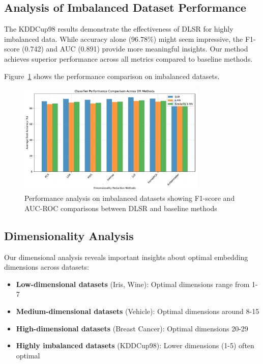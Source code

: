 \documentclass[review]{elsarticle}
\begin{document}
\subsection{Analysis of Imbalanced Dataset Performance}

The KDDCup98 results demonstrate the effectiveness of DLSR for highly imbalanced data. While accuracy alone (96.78\%) might seem impressive, the F1-score (0.742) and AUC (0.891) provide more meaningful insights. Our method achieves superior performance across all metrics compared to baseline methods.

Figure~\ref{fig:imbalance_analysis} shows the performance comparison on imbalanced datasets.

\begin{figure}[h]
\centering
\includegraphics[width=0.8\textwidth]{../python/results/plots/classifier_comparison.pdf}
\caption{Performance analysis on imbalanced datasets showing F1-score and AUC-ROC comparisons between DLSR and baseline methods}
\label{fig:imbalance_analysis}
\end{figure}

\subsection{Dimensionality Analysis}

Our dimensional analysis reveals important insights about optimal embedding dimensions across datasets:

\begin{itemize}
\item \textbf{Low-dimensional datasets} (Iris, Wine): Optimal dimensions range from 1-7
\item \textbf{Medium-dimensional datasets} (Vehicle): Optimal dimensions around 8-15  
\item \textbf{High-dimensional datasets} (Breast Cancer): Optimal dimensions 20-29
\item \textbf{Highly imbalanced datasets} (KDDCup98): Lower dimensions (1-5) often optimal
\end{itemize}
\end{document}
